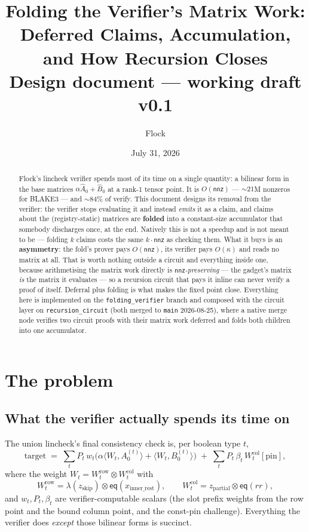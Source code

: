 \documentclass[11pt]{article}
\title{Folding the Verifier's Matrix Work:\\ Deferred Claims, Accumulation, and How Recursion Closes\\[0.6ex]
\large Design document --- working draft v0.1}
\author{Flock}
\date{July 31, 2026}
\newcommand{\eq}{\mathsf{eq}}
\newcommand{\nnz}{\mathsf{nnz}}
\newcommand{\ip}[2]{\langle #1, #2 \rangle}
\newcommand{\code}[1]{\texttt{#1}}
\theoremstyle{definition}
\begin{document}
\maketitle

\begin{abstract}
Flock's lincheck verifier spends most of its time on a single quantity: a
bilinear form in the base matrices $\alpha \hat A_0 + \hat B_0$ at a rank-1
tensor point. It is $O(\nnz)$ --- ${\sim}21$M nonzeros for BLAKE3 --- and
${\sim}84\%$ of verify. This document designs its removal from the verifier:
the verifier stops evaluating it and instead \emph{emits} it as a claim, and
claims about the (registry-static) matrices are \textbf{folded} into a
constant-size accumulator that somebody discharges once, at the end.
Natively this is not a speedup and is not meant to be --- folding $k$ claims
costs the same $k\cdot\nnz$ as checking them. What it buys is an
\textbf{asymmetry}: the fold's prover pays $O(\nnz)$, its verifier pays
$O(\kappa)$ and reads no matrix at all. That is worth nothing outside a
circuit and everything inside one, because arithmetising the matrix work
directly is \emph{$\nnz$-preserving} --- the gadget's matrix \emph{is} the
matrix it evaluates --- so a recursion circuit that pays it inline can never
verify a proof of itself. Deferral plus folding is what makes the fixed
point close. Everything here is implemented on the \code{folding\_verifier}
branch and composed with the circuit layer on \code{recursion\_circuit}
(both merged to \code{main} 2026-08-25),
where a native merge node verifies two circuit proofs with their matrix work
deferred and folds both children into one accumulator.
\end{abstract}

\tableofcontents

\section{The problem}\label{sec:problem}

\subsection{What the verifier actually spends its time on}

The union lincheck's final consistency check is, per boolean type $t$,
\[
  \text{target} \;=\; \sum_t P_t\,w_t\bigl(\alpha\ip{W_t}{A_0^{(t)}} +
  \ip{W_t}{B_0^{(t)}}\bigr) \;+\; \sum_t P_t\,\beta_t\,W^{\text{col}}_t[\text{pin}],
\]
where the weight $W_t = W^{\text{row}}_t \otimes W^{\text{col}}_t$ with
\[
  W^{\text{row}}_t = \lambda(z_{\text{skip}}) \otimes \eq(x_{\text{inner\_rest}}),
  \qquad
  W^{\text{col}}_t = z_{\text{partial}} \otimes \eq(rr),
\]
and $w_t, P_t, \beta_t$ are verifier-computable scalars (the slot prefix
weights from the row point and the bound column point, and the const-pin
challenge). Everything the verifier does \emph{except} those bilinear forms
is succinct.
\end{document}

